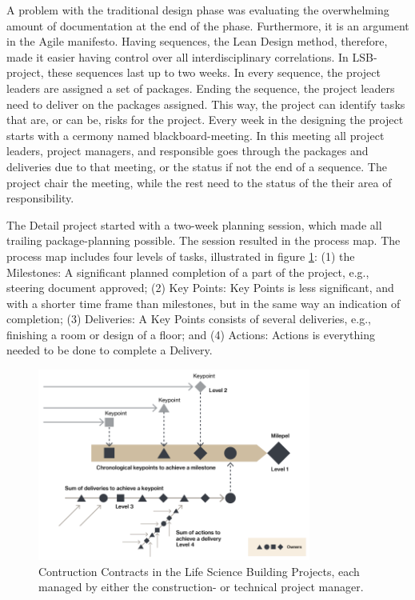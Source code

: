 A problem with the traditional design phase was evaluating the overwhelming amount of documentation at the end of the phase. Furthermore, it is an argument in the Agile manifesto. Having sequences, the Lean Design method, therefore, made it easier having control over all interdisciplinary correlations. In LSB-project, these sequences last up to two weeks. In every sequence, the project leaders are assigned a set of packages. Ending the sequence, the project leaders need to deliver on the packages assigned. This way, the project can identify tasks that are, or can be, risks for the project. Every week in the designing the project starts with a cermony named blackboard-meeting. In this meeting all project leaders, project managers, and responsible goes through the packages and deliveries due to that meeting, or the status if not the end of a sequence. The project chair the meeting, while the rest need to the status of the their area of responsibility. 

The Detail project started with a two-week planning session, which made all trailing package-planning possible. The session resulted in the process map. The process map includes four levels of tasks, illustrated in figure \ref{fig:Milestones-Keypoints-Deliveries-Actions}: (1) the Milestones: A significant planned completion of a part of the project, e.g., steering document approved; (2) Key Points: Key Points is less significant, and with a shorter time frame than milestones, but in the same way an indication of completion; (3) Deliveries: A Key Points consists of several deliveries, e.g., finishing a room or design of a floor; and (4) Actions: Actions is everything needed to be done to complete a Delivery. 

\begin{figure}
    \centering
    \includegraphics[width=0.8\textwidth]{fig/LSB_task_levels.png}
    \caption{Contruction Contracts in the Life Science Building Projects, each managed by either the construction- or technical project manager.}
    \label{fig:Milestones-Keypoints-Deliveries-Actions}
\end{figure}

